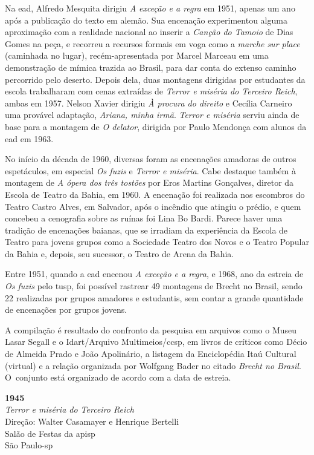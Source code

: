 Na {\sc ead}, Alfredo Mesquita dirigiu {\it A exceção e a regra} em 1951,
apenas um ano após a publicação do texto em alemão. Sua encenação
experimentou alguma aproximação com a realidade nacional ao inserir a
{\it Canção do Tamoio} de Dias Gomes na peça, e recorreu a recursos
formais em voga como a {\it marche sur place} (caminhada no lugar),
recém-apresentada por Marcel Marceau em uma demonstração de mímica
trazida ao Brasil, para dar conta do extenso caminho percorrido pelo
deserto. Depois dela, duas montagens dirigidas por estudantes da escola
trabalharam com cenas extraídas de {\it Terror e miséria do Terceiro
Reich}, ambas em 1957. Nelson Xavier dirigiu {\it À procura do direito}
e Cecília Carneiro uma provável adaptação, {\it Ariana, minha irmã}.
{\it Terror e miséria} serviu ainda de base para a montagem de {\it O
delator}, dirigida por Paulo Mendonça com alunos da {\sc ead} em 1963.

No início da década de 1960, diversas foram as encenações amadoras de
outros espetáculos, em especial {\it Os fuzis} e {\it Terror e miséria}.
Cabe destaque também à montagem de {\it A ópera dos três tostões} por
Eros Martins Gonçalves, diretor da Escola de Teatro da Bahia, em 1960. A
encenação foi realizada nos escombros do Teatro Castro Alves, em
Salvador, após o incêndio que atingiu o prédio, e quem concebeu a
cenografia sobre as ruínas foi Lina Bo Bardi. Parece haver uma tradição
de encenações baianas, que se irradiam da experiência da Escola de
Teatro para jovens grupos como a Sociedade Teatro dos Novos e o Teatro
Popular da Bahia e, depois, seu sucessor, o Teatro de Arena da Bahia.

Entre 1951, quando a {\sc ead} encenou {\it A exceção e a regra}, e 1968, ano
da estreia de {\it Os fuzis} pelo {\sc tusp}, foi possível rastrear 49
montagens de Brecht no Brasil, sendo 22 realizadas por grupos amadores e
estudantis, sem contar a grande quantidade de encenações por grupos
jovens.

A compilação é resultado do confronto da pesquisa em arquivos como o
Museu Lasar Segall e o Idart/Arquivo Multimeios/{\sc ccsp}, em livros de
críticos como Décio de Almeida Prado e João Apolinário, a listagem da
Enciclopédia Itaú Cultural (virtual) e a relação organizada por Wolfgang
Bader no citado {\it Brecht no Brasil}. O~conjunto está organizado de acordo
com a data de estreia.

\start[itemize]
\item{\bf 1945}\\
{\it Terror e miséria do Terceiro Reich}\\
Direção: Walter Casamayer e Henrique Bertelli\\
Salão de Festas da {\sc apisp}\\
São Paulo-{\sc sp}

